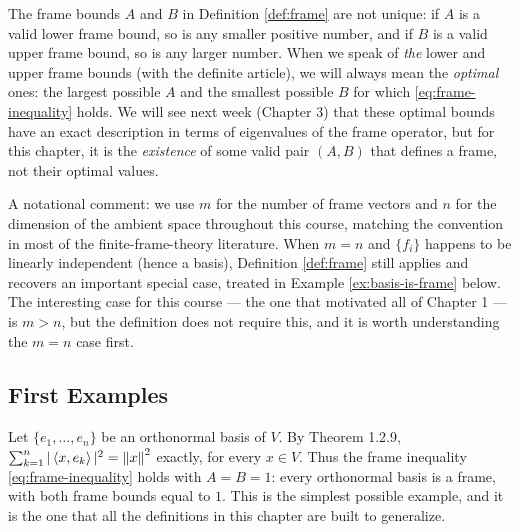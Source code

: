\begin{remark*}
The frame bounds $A$ and $B$ in Definition \ref{def:frame} are not unique: if $A$ is a valid lower frame bound, so is any smaller positive number, and if $B$ is a valid upper frame bound, so is any larger number. When we speak of \emph{the} lower and upper frame bounds (with the definite article), we will always mean the \emph{optimal} ones: the largest possible $A$ and the smallest possible $B$ for which \eqref{eq:frame-inequality} holds. We will see next week (Chapter 3) that these optimal bounds have an exact description in terms of eigenvalues of the frame operator, but for this chapter, it is the \emph{existence} of some valid pair $(A,B)$ that defines a frame, not their optimal values.
\end{remark*}

\begin{remark*}
A notational comment: we use $m$ for the number of frame vectors and $n$ for the dimension of the ambient space throughout this course, matching the convention in most of the finite-frame-theory literature. When $m = n$ and $\{f_i\}$ happens to be linearly independent (hence a basis), Definition \ref{def:frame} still applies and recovers an important special case, treated in Example \ref{ex:basis-is-frame} below. The interesting case for this course --- the one that motivated all of Chapter 1 --- is $m > n$, but the definition does not require this, and it is worth understanding the $m=n$ case first.
\end{remark*}

\subsection{First Examples}
\label{subsec:first-examples}

\begin{examplebox}[title={Example 2.1: An orthonormal basis is a (tight) frame}]
\label{ex:onb-is-frame}
Let $\{e_1, \dots, e_n\}$ be an orthonormal basis of $V$. By Theorem 1.2.9, $\sum_{k=1}^n |\left\langle x, e_k \right\rangle|^2 = \left\| x \right\|^2$ exactly, for every $x \in V$. Thus the frame inequality \eqref{eq:frame-inequality} holds with $A = B = 1$: every orthonormal basis is a frame, with both frame bounds equal to $1$. This is the simplest possible example, and it is the one that all the definitions in this chapter are built to generalize.
\end{examplebox}

